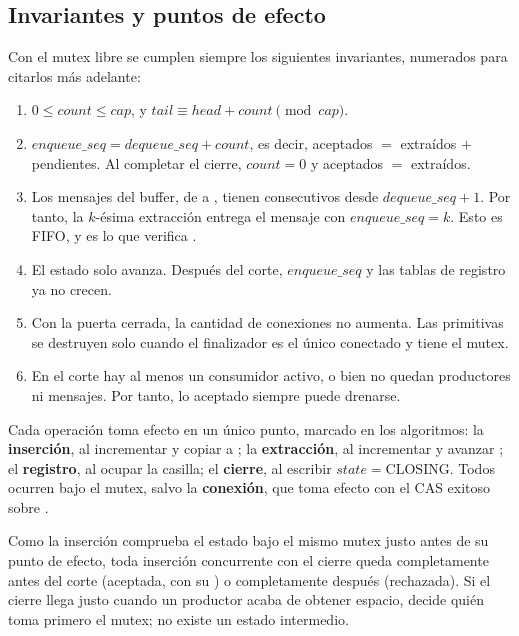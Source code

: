 \subsection{Invariantes y puntos de efecto}
\label{sec:invariantes}

Con el mutex libre se cumplen siempre los siguientes invariantes,
numerados para citarlos más adelante:
\begin{enumerate}
  \item[I1.] $0 \le \mathit{count} \le \mathit{cap}$, y $\mathit{tail}
  \equiv \mathit{head} + \mathit{count} \pmod{\mathit{cap}}$.
  \item[I2.] $\mathit{enqueue\_seq} = \mathit{dequeue\_seq} +
  \mathit{count}$, es decir, aceptados $=$ extraídos $+$ pendientes. Al
  completar el cierre, $\mathit{count}=0$ y aceptados $=$ extraídos.
  \item[I3.] Los mensajes del buffer, de  a , tienen
   consecutivos desde $\mathit{dequeue\_seq}+1$. Por
  tanto, la $k$-ésima extracción entrega el mensaje con
  $\mathit{enqueue\_seq}=k$. Esto es FIFO, y es lo que verifica
  .
  \item[I4.] El estado solo avanza. Después del corte,
  $\mathit{enqueue\_seq}$ y las tablas de registro ya no crecen.
  \item[I5.] Con la puerta cerrada, la cantidad de conexiones no aumenta.
  Las primitivas se destruyen solo cuando el finalizador es el único
  conectado y tiene el mutex.
  \item[I6.] En el corte hay al menos un consumidor activo, o bien no
  quedan productores ni mensajes. Por tanto, lo aceptado siempre puede
  drenarse.
\end{enumerate}

Cada operación toma efecto en un único punto, marcado en los algoritmos:
la \textbf{inserción}, al incrementar  y copiar a
; la \textbf{extracción}, al incrementar
 y avanzar ; el \textbf{registro}, al ocupar
la casilla; el \textbf{cierre}, al escribir
$\mathit{state}=\mathrm{CLOSING}$. Todos ocurren bajo el mutex, salvo la
\textbf{conexión}, que toma efecto con el CAS exitoso sobre .

Como la inserción comprueba el estado bajo el mismo mutex justo antes de
su punto de efecto, toda inserción concurrente con el cierre queda
completamente antes del corte (aceptada, con su ) o
completamente después (rechazada). Si el cierre llega justo cuando un
productor acaba de obtener espacio, decide quién toma primero el mutex;
no existe un estado intermedio.

